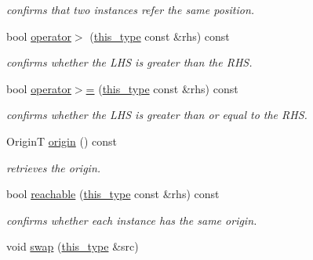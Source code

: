 \begin{DoxyCompactItemize}
\begin{DoxyCompactList}\small\item\em confirms that two instances refer the same position. \end{DoxyCompactList}\item 
\hypertarget{classhryky_1_1_offset_ptr_aef7f4027f9e1a75961d9f3352f153e93}{bool \hyperlink{classhryky_1_1_offset_ptr_aef7f4027f9e1a75961d9f3352f153e93}{operator$>$} (\hyperlink{classhryky_1_1_offset_ptr_a73a85221d5352162be046159f4aea008}{this\-\_\-type} const \&rhs) const }\label{classhryky_1_1_offset_ptr_aef7f4027f9e1a75961d9f3352f153e93}

\begin{DoxyCompactList}\small\item\em confirms whether the L\-H\-S is greater than the R\-H\-S. \end{DoxyCompactList}\item 
\hypertarget{classhryky_1_1_offset_ptr_adbd465e4e0a04117512a034b97cbc392}{bool \hyperlink{classhryky_1_1_offset_ptr_adbd465e4e0a04117512a034b97cbc392}{operator$>$=} (\hyperlink{classhryky_1_1_offset_ptr_a73a85221d5352162be046159f4aea008}{this\-\_\-type} const \&rhs) const }\label{classhryky_1_1_offset_ptr_adbd465e4e0a04117512a034b97cbc392}

\begin{DoxyCompactList}\small\item\em confirms whether the L\-H\-S is greater than or equal to the R\-H\-S. \end{DoxyCompactList}\item 
\hypertarget{classhryky_1_1_offset_ptr_af74f8eb3403a971a16440c7e1e164cbe}{Origin\-T \hyperlink{classhryky_1_1_offset_ptr_af74f8eb3403a971a16440c7e1e164cbe}{origin} () const }\label{classhryky_1_1_offset_ptr_af74f8eb3403a971a16440c7e1e164cbe}

\begin{DoxyCompactList}\small\item\em retrieves the origin. \end{DoxyCompactList}\item 
\hypertarget{classhryky_1_1_offset_ptr_a1296e4d0a123134cfa2fa44405c91ab3}{bool \hyperlink{classhryky_1_1_offset_ptr_a1296e4d0a123134cfa2fa44405c91ab3}{reachable} (\hyperlink{classhryky_1_1_offset_ptr_a73a85221d5352162be046159f4aea008}{this\-\_\-type} const \&rhs) const }\label{classhryky_1_1_offset_ptr_a1296e4d0a123134cfa2fa44405c91ab3}

\begin{DoxyCompactList}\small\item\em confirms whether each instance has the same origin. \end{DoxyCompactList}\item 
\hypertarget{classhryky_1_1_offset_ptr_ac1e20ff0f8e5ea1511abb6d6ed7745c2}{void \hyperlink{classhryky_1_1_offset_ptr_ac1e20ff0f8e5ea1511abb6d6ed7745c2}{swap} (\hyperlink{classhryky_1_1_offset_ptr_a73a85221d5352162be046159f4aea008}{this\-\_\-type} \&src)}\label{classhryky_1_1_offset_ptr_ac1e20ff0f8e5ea1511abb6d6ed7745c2}


\end{DoxyCompactItemize}
